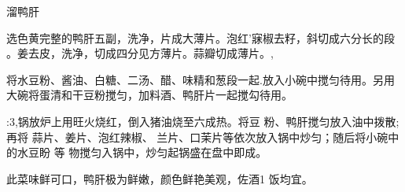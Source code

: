 \begin{recipe}{溜鸭肝}

\ingredients


\cooking

\step 选色黄完整的鸭肝五副，洗净，片成大薄片。泡红’寐椒去籽，斜切成六分长的段
。姜去皮，洗净，切成四分见方薄片。蒜瓣切成薄片。,

\step 将水豆粉、酱油、白糖、二汤、醋、味精和葱段一起.放入小碗中搅匀待用。另用
大碗将蛋清和干豆粉搅匀，加料酒、鸭肝片一起搅勾待用。

:3,锅放炉上用旺火烧红，倒入猪油烧至六成热。将豆 粉、鸭肝搅匀放入油中拨散;再将
蒜片、姜片、泡红辣椒、 兰片、口茉片等依次放入锅中炒匀；随后将小碗中的水豆盼 等
物搅匀入锅中，炒匀起锅盛在盘中即成。

\features

此菜味鲜可口，鸭肝极为鲜嫩，颜色鲜艳美观，佐酒1 饭均宜。

\end{recipe}

